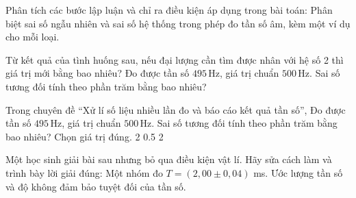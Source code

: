 \begin{ex}
Phân tích các bước lập luận và chỉ ra điều kiện áp dụng trong bài toán: Phân biệt sai số ngẫu nhiên và sai số hệ thống trong phép đo tần số âm, kèm một ví dụ cho mỗi loại.
\choiceTF

\end{ex}

\begin{ex}
Từ kết quả của tình huống sau, nếu đại lượng cần tìm được nhân với hệ số 2 thì giá trị mới bằng bao nhiêu? Đo được tần số $495\,\text{Hz}$, giá trị chuẩn $500\,\text{Hz}$. Sai số tương đối tính theo phần trăm bằng bao nhiêu?
\end{ex}

\begin{ex}
Trong chuyên đề “Xử lí số liệu nhiều lần đo và báo cáo kết quả tần số”, Đo được tần số $495\,\text{Hz}$, giá trị chuẩn $500\,\text{Hz}$. Sai số tương đối tính theo phần trăm bằng bao nhiêu? Chọn giá trị đúng.
\choice
{}
{2}
{0.5}
{2}
\end{ex}

\begin{ex}
Một học sinh giải bài sau nhưng bỏ qua điều kiện vật lí. Hãy sửa cách làm và trình bày lời giải đúng: Một nhóm đo $T=(2,00\pm0,04)$ ms. Ước lượng tần số và độ không đảm bảo tuyệt đối của tần số.
\choiceTF

\end{ex}

